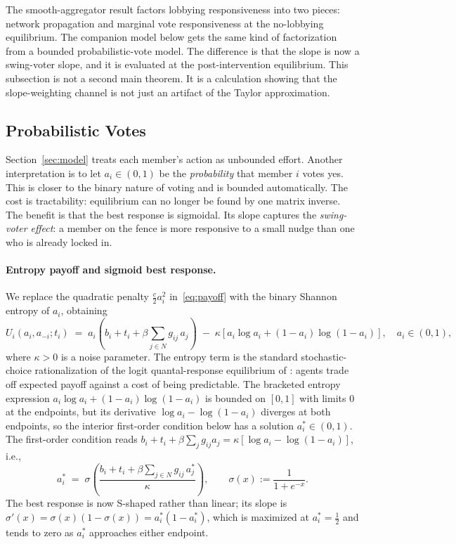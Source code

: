 \documentclass[11pt,letterpaper]{article}
\theoremstyle{plain}
\theoremstyle{definition}
\theoremstyle{remark}
\begin{document}
The smooth-aggregator result factors lobbying responsiveness into two pieces: network propagation and marginal vote responsiveness at the no-lobbying equilibrium. The companion model below gets the same kind of factorization from a bounded probabilistic-vote model. The difference is that the slope is now a swing-voter slope, and it is evaluated at the post-intervention equilibrium. This subsection is not a second main theorem. It is a calculation showing that the slope-weighting channel is not just an artifact of the Taylor approximation.

\subsection{Probabilistic Votes}
\label{sec:modelB}

Section~\ref{sec:model} treats each member's action as unbounded effort. Another interpretation is to let $a_i \in (0,1)$ be the \emph{probability} that member $i$ votes yes. This is closer to the binary nature of voting and is bounded automatically. The cost is tractability: equilibrium can no longer be found by one matrix inverse. The benefit is that the best response is sigmoidal. Its slope captures the \emph{swing-voter effect}: a member on the fence is more responsive to a small nudge than one who is already locked in.

\paragraph{Entropy payoff and sigmoid best response.} We replace the quadratic penalty $\tfrac{c}{2}a_i^2$ in~\eqref{eq:payoff} with the binary Shannon entropy of $a_i$, obtaining
\begin{equation}
U_i(a_i, a_{-i}; t_i) \;=\; a_i\!\left(b_i + t_i + \beta \sum_{j \in N} g_{ij}\, a_j\right) \;-\; \kappa\!\left[a_i \log a_i + (1-a_i)\log(1-a_i)\right], \quad a_i \in (0,1),
\label{eq:payoff_B}
\end{equation}
where $\kappa > 0$ is a noise parameter. The entropy term is the standard stochastic-choice rationalization of the logit quantal-response equilibrium of \citet{mckelvey1995}: agents trade off expected payoff against a cost of being predictable. The bracketed entropy expression $a_i \log a_i + (1 - a_i)\log(1 - a_i)$ is bounded on $[0,1]$ with limits $0$ at the endpoints, but its derivative $\log a_i - \log(1-a_i)$ diverges at both endpoints, so the interior first-order condition below has a solution $a_i^* \in (0,1)$. The first-order condition reads $b_i + t_i + \beta \sum_j g_{ij} a_j = \kappa[\log a_i - \log(1-a_i)]$, i.e.,
\begin{equation}
a_i^* \;=\; \sigma\!\left(\frac{b_i + t_i + \beta \sum_{j \in N} g_{ij}\, a_j^*}{\kappa}\right), \qquad \sigma(x) := \frac{1}{1 + e^{-x}}.
\label{eq:sigmoid_BR}
\end{equation}
The best response is now S-shaped rather than linear; its slope is $\sigma'(x) = \sigma(x)(1-\sigma(x)) = a_i^*(1-a_i^*)$, which is maximized at $a_i^* = \tfrac{1}{2}$ and tends to zero as $a_i^*$ approaches either endpoint.
\end{document}
